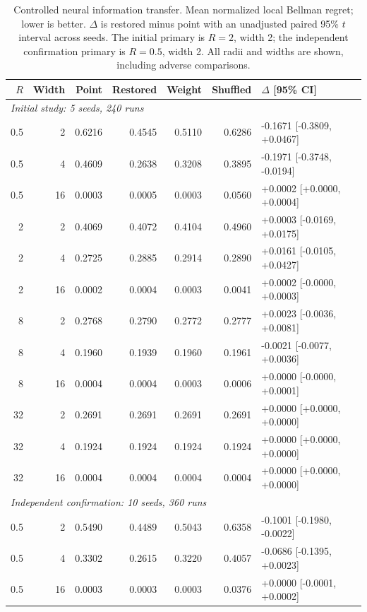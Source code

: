 \begin{table}[htbp]
\centering\small\setlength{\tabcolsep}{4pt}
\caption{Controlled neural information transfer. Mean normalized local Bellman regret; lower is better. $\Delta$ is restored minus point with an unadjusted paired 95\% $t$ interval across seeds. The initial primary is $R=2$, width 2; the independent confirmation primary is $R=0.5$, width 2. All radii and widths are shown, including adverse comparisons.}
\label{tab:neural-information}
\begin{tabular}{rrrrrrl}
\toprule
$R$ & Width & Point & Restored & Weight & Shuffled & $\Delta$ [95\% CI]\\
\midrule
\multicolumn{7}{l}{\textit{Initial study: 5 seeds, 240 runs}}\\
0.5 & 2 & 0.6216 & 0.4545 & 0.5110 & 0.6286 & -0.1671 [-0.3809, +0.0467]\\
0.5 & 4 & 0.4609 & 0.2638 & 0.3208 & 0.3895 & -0.1971 [-0.3748, -0.0194]\\
0.5 & 16 & 0.0003 & 0.0005 & 0.0003 & 0.0560 & +0.0002 [+0.0000, +0.0004]\\
2 & 2 & 0.4069 & 0.4072 & 0.4104 & 0.4960 & +0.0003 [-0.0169, +0.0175]\\
2 & 4 & 0.2725 & 0.2885 & 0.2914 & 0.2890 & +0.0161 [-0.0105, +0.0427]\\
2 & 16 & 0.0002 & 0.0004 & 0.0003 & 0.0041 & +0.0002 [-0.0000, +0.0003]\\
8 & 2 & 0.2768 & 0.2790 & 0.2772 & 0.2777 & +0.0023 [-0.0036, +0.0081]\\
8 & 4 & 0.1960 & 0.1939 & 0.1960 & 0.1961 & -0.0021 [-0.0077, +0.0036]\\
8 & 16 & 0.0004 & 0.0004 & 0.0003 & 0.0006 & +0.0000 [-0.0000, +0.0001]\\
32 & 2 & 0.2691 & 0.2691 & 0.2691 & 0.2691 & +0.0000 [+0.0000, +0.0000]\\
32 & 4 & 0.1924 & 0.1924 & 0.1924 & 0.1924 & +0.0000 [+0.0000, +0.0000]\\
32 & 16 & 0.0004 & 0.0004 & 0.0004 & 0.0004 & +0.0000 [+0.0000, +0.0000]\\
\midrule
\multicolumn{7}{l}{\textit{Independent confirmation: 10 seeds, 360 runs}}\\
0.5 & 2 & 0.5490 & 0.4489 & 0.5043 & 0.6358 & -0.1001 [-0.1980, -0.0022]\\
0.5 & 4 & 0.3302 & 0.2615 & 0.3220 & 0.4057 & -0.0686 [-0.1395, +0.0023]\\
0.5 & 16 & 0.0003 & 0.0003 & 0.0003 & 0.0376 & +0.0000 [-0.0001, +0.0002]\\

\end{tabular}
\end{table}
